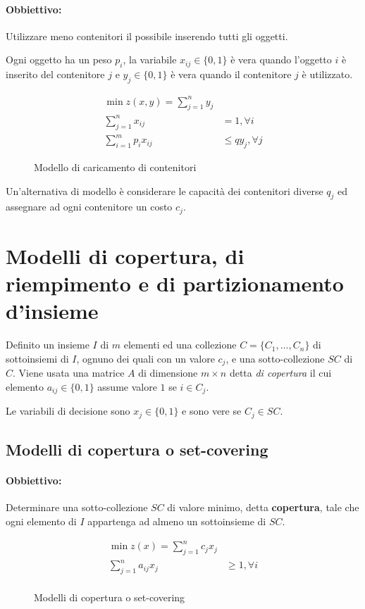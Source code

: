 \documentclass[\main/main.tex]{subfiles}
\begin{document}
\paragraph*{Obbiettivo:} Utilizzare meno contenitori il possibile inserendo tutti gli oggetti.

Ogni oggetto ha un peso $p_i$, la variabile $x_{ij} \in \{0,1\}$ è vera quando l'oggetto $i$ è inserito del contenitore $j$ e $y_j \in \{0,1\}$ è vera quando il contenitore $j$ è utilizzato.

\begin{figure}
  \begin{align*}
    \min z(x,y) = \sum_{j=1}^n y_j                    \\
    \sum_{j=1}^n x_{ij}     & = 1, \forall i        \\
    \sum_{i=1}^m p_i x_{ij} & \leq q y_j, \forall j
  \end{align*}
  \caption{Modello di caricamento di contenitori}
\end{figure}

Un'alternativa di modello è considerare le capacità dei contenitori diverse $q_j$ ed assegnare ad ogni contenitore un costo $c_j$.

\section{Modelli di copertura, di riempimento e di partizionamento d'insieme}
Definito un insieme $I$ di $m$ elementi ed una collezione $C = \{C_1, \ldots, C_n\}$ di sottoinsiemi di $I$, ognuno dei quali con un valore $c_j$, e una sotto-collezione $SC$ di $C$. Viene usata una matrice $A$ di dimensione $m\times n$ detta \textit{di copertura} il cui elemento $a_{ij} \in \{0,1\}$ assume valore $1$ se $i \in C_j$.

Le variabili di decisione sono $x_j \in \{0,1\}$ e sono vere se $C_j \in SC$.

\subsection{Modelli di copertura o set-covering}
\paragraph*{Obbiettivo:} Determinare una sotto-collezione $SC$ di valore minimo, detta \textbf{copertura}, tale che ogni elemento di $I$ appartenga ad almeno un sottoinsieme di $SC$.

\begin{figure}
  \begin{align*}
    \min z(x) = \sum_{j=1}^n c_j x_j            \\
    \sum_{j=1}^n a_{ij} x_j & \geq 1, \forall i \\
  \end{align*}
  \caption{Modelli di copertura o set-covering}
\end{figure}
\end{document}
